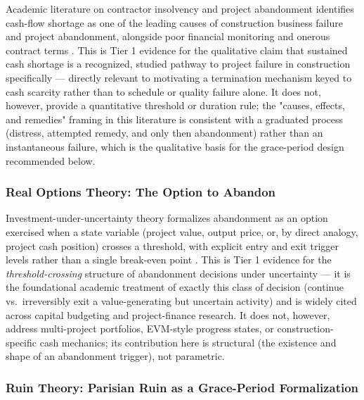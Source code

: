 Academic literature on contractor insolvency and project abandonment identifies cash-flow shortage as one of the leading causes of construction business failure and project abandonment, alongside poor financial monitoring and onerous contract terms \cite{macbarango2017abandonment}. This is Tier 1 evidence for the qualitative claim that sustained cash shortage is a recognized, studied pathway to project failure in construction specifically — directly relevant to motivating a termination mechanism keyed to cash scarcity rather than to schedule or quality failure alone. It does not, however, provide a quantitative threshold or duration rule; the "causes, effects, and remedies" framing in this literature is consistent with a graduated process (distress, attempted remedy, and only then abandonment) rather than an instantaneous failure, which is the qualitative basis for the grace-period design recommended below.

\subsubsection{Real Options Theory: The Option to Abandon}
\label{subsubsec:lit_real_options}

Investment-under-uncertainty theory formalizes abandonment as an option exercised when a state variable (project value, output price, or, by direct analogy, project cash position) crosses a threshold, with explicit entry and exit trigger levels rather than a single break-even point \cite{dixitpindyck1994investment}. This is Tier 1 evidence for the \emph{threshold-crossing} structure of abandonment decisions under uncertainty — it is the foundational academic treatment of exactly this class of decision (continue vs.\ irreversibly exit a value-generating but uncertain activity) and is widely cited across capital budgeting and project-finance research. It does not, however, address multi-project portfolios, EVM-style progress states, or construction-specific cash mechanics; its contribution here is structural (the existence and shape of an abandonment trigger), not parametric.

\subsubsection{Ruin Theory: Parisian Ruin as a Grace-Period Formalization}
\label{subsubsec:lit_parisian_ruin}

